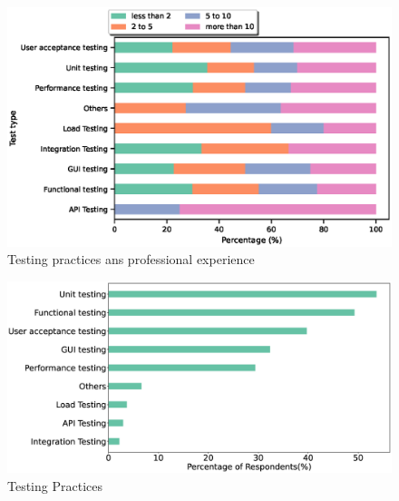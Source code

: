 \begin{figure}[h]
\centering
  \includegraphics[scale=0.6]{Figures/Testing_Type_and_Experience}
  \caption{Testing practices ans professional experience}
  \label{fig:testing type and experience}
\end{figure}

\begin{figure}[h]
\centering
  \includegraphics[scale=0.2]{Figures/Respondents_testing_practices}
  \caption{Testing Practices}
  \label{fig:testing}
\end{figure}

